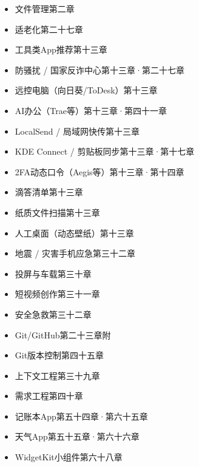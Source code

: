 
\begin{itemize}
  \item 文件管理第二章
  \item 适老化第二十七章
  \item 工具类App推荐第十三章
  \item 防骚扰 / 国家反诈中心第十三章·第二十七章
  \item 远控电脑（向日葵/ToDesk）第十三章
  \item AI办公（Trae等）第十三章·第四十一章
  \item LocalSend / 局域网快传第十三章
  \item KDE Connect / 剪贴板同步第十三章·第十七章
  \item 2FA动态口令（Aegis等）第十三章·第十四章
  \item 滴答清单第十三章
  \item 纸质文件扫描第十三章
  \item 人工桌面（动态壁纸）第十三章
  \item 地震 / 灾害手机应急第三十二章
  \item 投屏与车载第三十章
  \item 短视频创作第三十一章
  \item 安全急救第三十二章
  \item Git/GitHub第二十三章附
  \item Git版本控制第四十五章
  \item 上下文工程第三十九章
  \item 需求工程第四十章
  \item 记账本App第五十四章·第六十五章
  \item 天气App第五十五章·第六十六章
  \item WidgetKit小组件第六十八章
\end{itemize}
